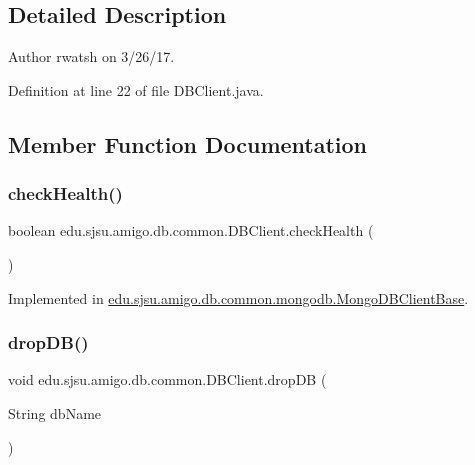 \subsection{Detailed Description}
\begin{DoxyAuthor}{Author}
rwatsh on 3/26/17. 
\end{DoxyAuthor}


Definition at line 22 of file D\+B\+Client.\+java.



\subsection{Member Function Documentation}
\mbox{\label{interfaceedu_1_1sjsu_1_1amigo_1_1db_1_1common_1_1_d_b_client_af6387539a42d236e515d04bdf32e171d}} 
\subsubsection{\texorpdfstring{check\+Health()}{checkHealth()}}
{\footnotesize\ttfamily boolean edu.\+sjsu.\+amigo.\+db.\+common.\+D\+B\+Client.\+check\+Health (\begin{DoxyParamCaption}{ }\end{DoxyParamCaption})}



Implemented in \hyperlink{classedu_1_1sjsu_1_1amigo_1_1db_1_1common_1_1mongodb_1_1_mongo_d_b_client_base_aad703e503bf7486a5ac2f2838ef49108}{edu.\+sjsu.\+amigo.\+db.\+common.\+mongodb.\+Mongo\+D\+B\+Client\+Base}.

\mbox{\label{interfaceedu_1_1sjsu_1_1amigo_1_1db_1_1common_1_1_d_b_client_aaf5afc64d802275eb4b2f566166cd245}} 
\subsubsection{\texorpdfstring{drop\+D\+B()}{dropDB()}}
{\footnotesize\ttfamily void edu.\+sjsu.\+amigo.\+db.\+common.\+D\+B\+Client.\+drop\+DB (\begin{DoxyParamCaption}\item[{String}]{db\+Name }\end{DoxyParamCaption})}



